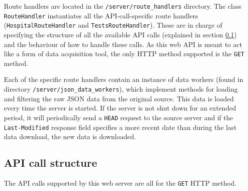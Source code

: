 \documentclass[pdftex, 11pt, a4paper]{article}
\newcommand{\code}{\texttt}
\begin{document}
    Route handlers are located in the \code{/server/route\_handlers} directory.
    The class \code{RouteHandler} instantiates all the API-call-specific route handlers
    (\code{HospitalRouteHandler} and \code{TestsRouteHandler}). These are in charge of
    specifying the structure of all the available API calls (explained in section
    \ref{sec:api_structure}) and the behaviour of how to handle these calls. As this web
    API is meant to act like a form of data acquisition tool, the only HTTP method
    supported is the \code{GET} method.

    Each of the specific route handlers contain an instance of data workers
    (found in directory \newline \code{/server/json\_data\_workers}), which implement methods for
    loading and filtering the raw JSON data from the original source. This data is loaded
    every time the server is started. If the server is not shut down for an extended period,
    it will periodically send a \code{HEAD} request to the source server and if the
    \code{Last-Modified} response field specifies a more recent date than during
    the last data download, the new data is downloaded.

    \subsection{API call structure} \label{sec:api_structure}
    The API calls supported by this web server are all for the \code{GET} HTTP method.
\end{document}
